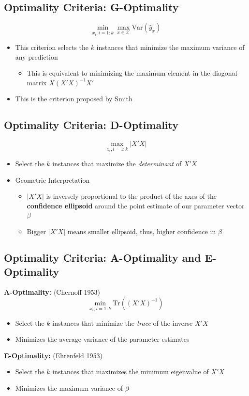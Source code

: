 \documentclass[10pt]{article}
\begin{document}
\subsection*{Optimality Criteria: G-Optimality}
\[\min_{x_i, i = 1:k} \max_{x \in \mathcal{X}} \text{Var}(\hat{y}_x)\]
\begin{itemize}
	\item This criterion selects the $k$ instances that minimize the maximum variance of any prediction
	\begin{itemize}
	    \item This is equivalent to minimizing the maximum element in the diagonal matrix $X(X'X)^{-1} X'$
    \end{itemize}
    \item This is the criterion proposed by Smith
\end{itemize}

\subsection*{Optimality Criteria: D-Optimality}
\[\max_{x_i, i = 1:k} |X'X|\]
\begin{itemize}
	\item Select the $k$ instances that maximize the \textit{determinant} of $X'X$
	\item Geometric Interpretation
	\begin{itemize}
	    \item $|X'X|$ is inversely proportional to the product of the axes of the \textbf{confidence ellipsoid} around the point estimate of our parameter vector $\beta$
	    \item Bigger $|X'X|$ means smaller ellipsoid, thus, higher confidence in $\beta$
    \end{itemize}
\end{itemize}

\subsection*{Optimality Criteria: A-Optimality and E-Optimality}
\textbf{A-Optimality:} (Chernoff 1953)
\[\min_{x_i, i = 1:k} \text{Tr}\left((X'X)^{-1}\right)\]
\begin{itemize}
	\item Select the $k$ instances that minimize the \textit{trace} of the inverse $X'X$
	\item Minimizes the average variance of the parameter estimates
\end{itemize}
\textbf{E-Optimality:} (Ehrenfeld 1953)
\begin{itemize}
	\item Select the $k$ instances that maximizes the minimum eigenvalue of $X'X$
	\item Minimizes the maximum variance of $\beta$
\end{itemize}
\end{document}

